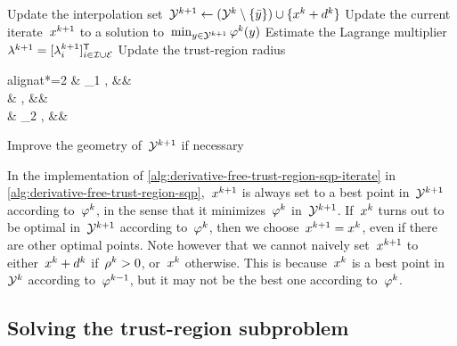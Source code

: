 \begin{algorithm}
{\begin{algomathdisplay}
            \ratio[k] \gets {}
        \end{algomathdisplay}
        Update the interpolation set~$\xpt[k + 1] \gets (\xpt[k] \setminus \set{\bar{y}}) \cup \set{\iter[k] + \step[k]}$\;
        Update the current iterate~$\iter[k + 1]$ to a solution to~$\min_{y \in \xpt[k + 1]} \merit[k](y)$\; 
        Estimate the Lagrange multiplier~$\lm[k + 1] = [\lm[k + 1]_i]_{i \in \iub \cup \ieq}^{\T}$\; 
        Update the trust-region radius
        \begin{algoempheq}[left={\rad[k + 1] \gets \empheqlbrace}]{alignat*=2}
            & \theta_1 \rad[k],  && \quad {}\\
            & \rad[k],           && \quad {}\\
            & \theta_2 \rad[k],  && \quad {}
        \end{algoempheq} \label{alg:derivative-free-trust-region-sqp-radius}
        Improve the geometry of~$\xpt[k + 1]$ if necessary\; \label{alg:derivative-free-trust-region-sqp-geometry}
    }
\end{algorithm}

In the implementation of \cref{alg:derivative-free-trust-region-sqp-iterate} in \cref{alg:derivative-free-trust-region-sqp},~$\iter[k + 1]$ is always set to a best point in~$\xpt[k + 1]$ according to~$\merit[k]$, in the sense that it minimizes~$\merit[k]$ in~$\xpt[k + 1]$.
If~$\iter[k]$ turns out to be optimal in~$\xpt[k + 1]$ according to~$\merit[k]$, then we choose~$\iter[k + 1] = \iter[k]$, even if there are other optimal points.
Note however that we cannot naively set~$\iter[k + 1]$ to either~$\iter[k] + \step[k]$ if~$\ratio[k] > 0$, or~$\iter[k]$ otherwise.
This is because~$\iter[k]$ is a best point in~$\xpt[k]$ according to~$\merit[k - 1]$, but it may not be the best one according to~$\merit[k]$.

\subsection{Solving the trust-region  subproblem}
\label{subsec:solving-trust-region-subproblem}

